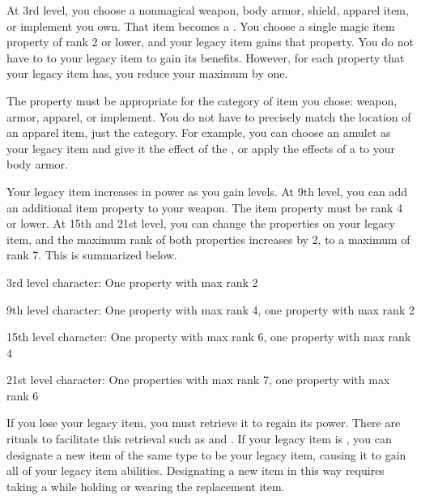         At 3rd level, you choose a nonmagical weapon, body armor, shield, apparel item, or implement you own.
        That item becomes a .
        You choose a single magic item property of rank 2 or lower, and your legacy item gains that property.
        You do not have to  to your legacy item to gain its benefits.
        However, for each  property that your legacy item has, you reduce your maximum  by one.

        The property must be appropriate for the category of item you chose: weapon, armor, apparel, or implement.
        You do not have to precisely match the location of an apparel item, just the category.
        For example, you can choose an amulet as your legacy item and give it the effect of the , or apply the effects of a  to your body armor.

        Your legacy item increases in power as you gain levels.
        At 9th level, you can add an additional item property to your weapon.
        The item property must be rank 4 or lower.
        At 15th and 21st level, you can change the properties on your legacy item, and the maximum rank of both properties increases by 2, to a maximum of rank 7.
        This is summarized below.
        \begin{raggeditemize}
            \item 3rd level character: One property with max rank 2
            \item 9th level character: One property with max rank 4, one property with max rank 2
            \item 15th level character: One property with max rank 6, one property with max rank 4
            \item 21st level character: One properties with max rank 7, one property with max rank 6
        \end{raggeditemize}

        If you lose your legacy item, you must retrieve it to regain its power.
        There are rituals to facilitate this retrieval such as  and .
        If your legacy item is , you can designate a new item of the same type to be your legacy item, causing it to gain all of your legacy item abilities.
        Designating a new item in this way requires taking a  while holding or wearing the replacement item.

